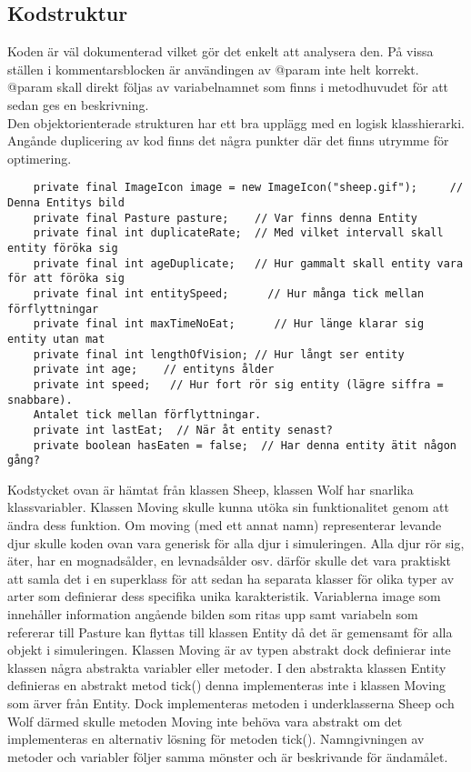 \documentclass[hidelinks]{article}
\begin{document}
\subsection*{Kodstruktur}
Koden är väl dokumenterad vilket gör det enkelt att analysera den. På vissa ställen i kommentarsblocken
är användingen av @param inte helt korrekt. @param skall direkt följas av variabelnamnet som finns i metodhuvudet för att sedan ges en beskrivning.
\\
Den objektorienterade strukturen har ett bra upplägg med en logisk klasshierarki. Angånde duplicering av kod finns det några punkter där det finns utrymme för optimering.
\begin{verbatim}
    private final ImageIcon image = new ImageIcon("sheep.gif");     // Denna Entitys bild
    private final Pasture pasture;    // Var finns denna Entity
    private final int duplicateRate;  // Med vilket intervall skall entity föröka sig
    private final int ageDuplicate;   // Hur gammalt skall entity vara för att föröka sig
    private final int entitySpeed;      // Hur många tick mellan förflyttningar
    private final int maxTimeNoEat;      // Hur länge klarar sig entity utan mat
    private final int lengthOfVision; // Hur långt ser entity
    private int age;    // entityns ålder
    private int speed;   // Hur fort rör sig entity (lägre siffra = snabbare).
    Antalet tick mellan förflyttningar.
    private int lastEat;  // När åt entity senast?
    private boolean hasEaten = false;  // Har denna entity ätit någon gång?
\end{verbatim}
Kodstycket ovan är hämtat från klassen Sheep, klassen Wolf har snarlika klassvariabler. Klassen Moving skulle
kunna utöka sin funktionalitet genom att ändra dess funktion. Om moving (med ett annat namn) representerar levande djur
skulle koden ovan vara generisk för alla djur i simuleringen. Alla djur rör sig, äter, har en mognadsålder, en levnadsålder osv. därför skulle det vara
praktiskt att samla det i en superklass för att sedan ha separata klasser för olika typer av arter som definierar dess specifika unika karakteristik.
Variablerna image som innehåller information angående bilden som ritas upp samt variabeln som refererar till Pasture kan flyttas till klassen Entity då det är
gemensamt för alla objekt i simuleringen.
Klassen Moving är av typen abstrakt dock definierar inte klassen några abstrakta variabler eller metoder. I den abstrakta klassen Entity definieras en abstrakt metod tick()
denna implementeras inte i klassen Moving som ärver från Entity. Dock implementeras metoden i underklasserna Sheep och Wolf därmed skulle metoden Moving inte behöva vara abstrakt
om det implementeras en alternativ lösning för metoden tick().
Namngivningen av metoder och variabler följer samma mönster och är beskrivande för ändamålet.
\end{document}
